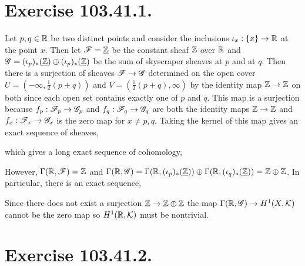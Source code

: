\documentclass[12pt]{article}
\begin{document}

\section{Exercise 103.41.1.}

Let $p, q \in \mathbb{R}$ be two distinct points and consider the inclusions $\iota_x : \{ x \} \to \mathbb{R}$ at the point $x$. Then let $\mathscr{F} = \underline{\mathbb{Z}}$ be the constant sheaf $\mathbb{Z}$ over $\mathbb{R}$ and $\mathscr{G} = (\iota_p)_*(\underline{\mathbb{Z}}) \oplus (\iota_p)_*(\underline{\mathbb{Z}})$ be the sum of skyscraper sheaves at $p$ and at $q$. Then there is a surjection of sheaves $\mathscr{F} \to \mathscr{G}$ determined on the open cover $U = (-\infty, \tfrac{1}{2}(p + q))$ and $V = (\tfrac{1}{2}(p + q), \infty)$ by the identity map $\mathbb{Z} \to \mathbb{Z}$ on both since each open set contains exactly one of $p$ and $q$. This map is a surjection because $f_p : \mathscr{F}_p \to \mathscr{G}_p$ and $f_q : \mathscr{F}_q \to \mathscr{G}_q$ are both the identity maps $\mathbb{Z} \to \mathbb{Z}$ and $f_x : \mathscr{F}_x \to \mathscr{G}_x$ is the zero map for $x \neq p,q$. Taking the kernel of this map gives an exact sequence of sheaves,
\begin{center}
\end{center}
which gives a long exact sequence of cohomology,
\begin{center}
\end{center}
However, $\Gamma(\mathbb{R}, \mathscr{F}) = \mathbb{Z}$ and $\Gamma(\mathbb{R}, \mathscr{G}) = \Gamma(\mathbb{R}, (\iota_p)_*(\underline{\mathbb{Z}})) \oplus \Gamma(\mathbb{R}, (\iota_q)_*(\underline{\mathbb{Z}})) = \mathbb{Z} \oplus \mathbb{Z}$. In particular, there is an exact sequence,
\begin{center}
\end{center}
Since there does not exist a surjection $\mathbb{Z} \to \mathbb{Z} \oplus \mathbb{Z}$ the map $\Gamma(\mathbb{R}, \mathscr{G}) \to H^1(X, \mathcal{K})$ cannot be the zero map so $H^1(\mathbb{R}, \mathcal{K})$ must be nontrivial. 

\section{Exercise 103.41.2.}
\end{document}

